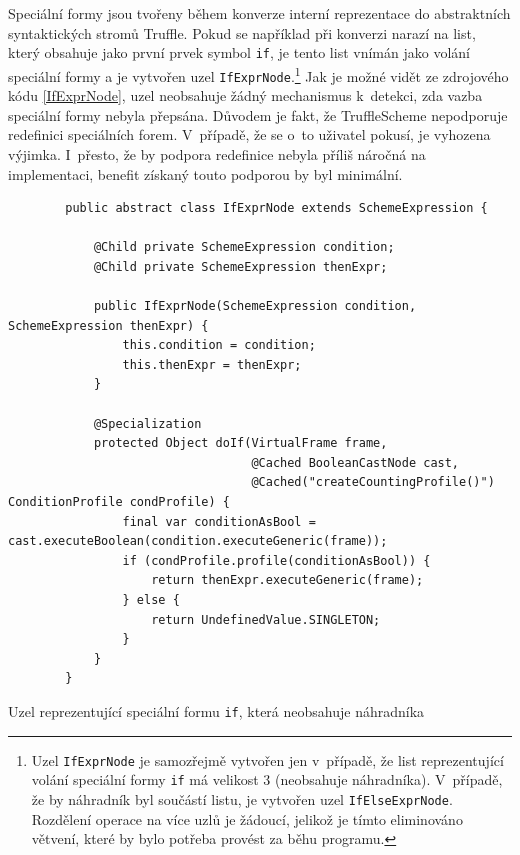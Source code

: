 \documentclass[
  master,
  biblatex,
  figures=true,
  theorems,
  sourcecodes,
  glossaries,
  index
]{kidiplom}
\begin{document}
Speciální formy jsou tvořeny během konverze interní reprezentace do abstraktních syntaktických stromů Truffle. Pokud se například při konverzi narazí na list, který obsahuje jako první prvek symbol \texttt{if}, je tento list vnímán jako volání speciální formy a je vytvořen uzel \texttt{IfExprNode}.\footnote{Uzel \texttt{IfExprNode} je samozřejmě vytvořen jen v~případě, že list reprezentující volání speciální formy \texttt{if} má velikost 3 (neobsahuje náhradníka). V~případě, že by náhradník byl součástí listu, je vytvořen uzel \texttt{IfElseExprNode}. Rozdělení operace na více uzlů je žádoucí, jelikož je tímto eliminováno větvení, které by bylo potřeba provést za běhu programu.} Jak je možné vidět ze zdrojového kódu \ref{IfExprNode}, uzel neobsahuje žádný mechanismus k~detekci, zda vazba speciální formy nebyla přepsána. Důvodem je fakt, že TruffleScheme nepodporuje redefinici speciálních forem. V~případě, že se o~to uživatel pokusí, je vyhozena výjimka. I~přesto, že by podpora redefinice nebyla příliš náročná na implementaci, benefit získaný touto podporou by byl minimální. 

\begin{listing} [H]
    \begin{verbatim}
        public abstract class IfExprNode extends SchemeExpression {
    
            @Child private SchemeExpression condition;
            @Child private SchemeExpression thenExpr;
            
            public IfExprNode(SchemeExpression condition, SchemeExpression thenExpr) {
                this.condition = condition;
                this.thenExpr = thenExpr;
            }
    
            @Specialization
            protected Object doIf(VirtualFrame frame,
                                  @Cached BooleanCastNode cast,
                                  @Cached("createCountingProfile()") ConditionProfile condProfile) {
                final var conditionAsBool = cast.executeBoolean(condition.executeGeneric(frame));
                if (condProfile.profile(conditionAsBool)) {
                    return thenExpr.executeGeneric(frame);
                } else {
                    return UndefinedValue.SINGLETON;
                }
            }
        }
    \end{verbatim}
    \caption{Uzel reprezentující speciální formu \texttt{if}, která neobsahuje náhradníka}
    \label{IfExprNode}
\end{listing}
\end{document}
